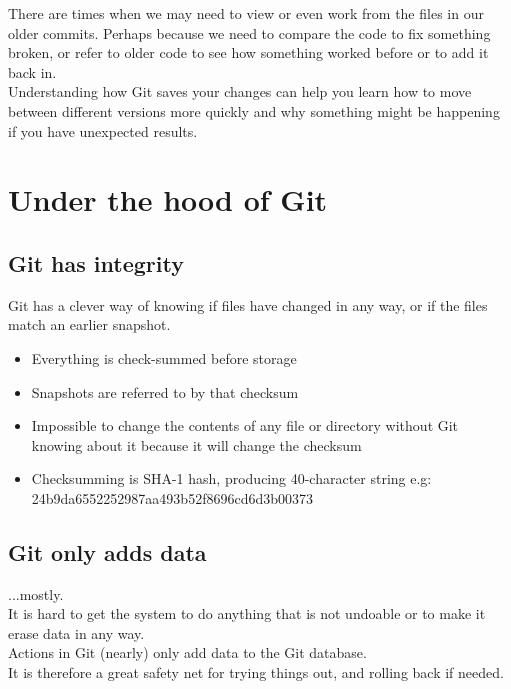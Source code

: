 There are times when we may need to view or even work from the files in our older commits. Perhaps because we need to compare the code to fix something broken, or refer to older code to see how something worked before or to add it back in.
\\

Understanding how Git saves your changes can help you learn how to move between different versions more quickly and why something might be happening if you have unexpected results.


\section{Under the hood of Git}

\subsection{Git has integrity}

Git has a clever way of knowing if files have changed in any way, or if the files match an earlier snapshot.

\begin{itemize}
	\item Everything is check-summed before storage
	\item Snapshots are referred to by that checksum
	\item Impossible to change the contents of any file or directory without Git knowing about it because it will change the checksum
	\item Checksumming is SHA-1 hash, producing 40-character string e.g:
	\\
24b9da6552252987aa493b52f8696cd6d3b00373
\end{itemize}

\subsection{Git only adds data}

...mostly.
\\

It is hard to get the system to do anything that is not undoable or to make it erase data in any way.
\\

Actions in Git (nearly) only add data to the Git database.
\\

It is therefore a great safety net for trying things out, and rolling back if needed.
\\

